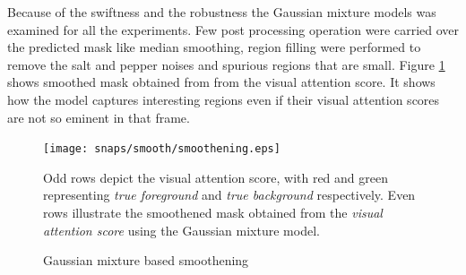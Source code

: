 \par Because of the swiftness and the robustness the Gaussian mixture models was examined for all the experiments.  Few post processing operation were carried over the predicted mask like median smoothing, region filling were performed to remove the salt and pepper noises and spurious regions that are small.  Figure \ref{fig:smoothen} shows smoothed mask obtained from from the visual attention score.  It shows how the model captures interesting regions even if their visual attention scores are not so eminent in that frame.
\begin{figure}[!htpb]
   \begin{center}
	    \texttt{[image: snaps/smooth/smoothening.eps]}     
     \caption {Gaussian mixture based smoothening}
   \label{fig:smoothen}
   \medskip 
 	\small Odd rows depict the visual attention score, with red and green representing \textit{true foreground} and \textit{true background} respectively.  Even rows illustrate the smoothened mask obtained from the \textit{visual attention score} using the Gaussian mixture model. 
   \end{center}
 \end{figure}
 

